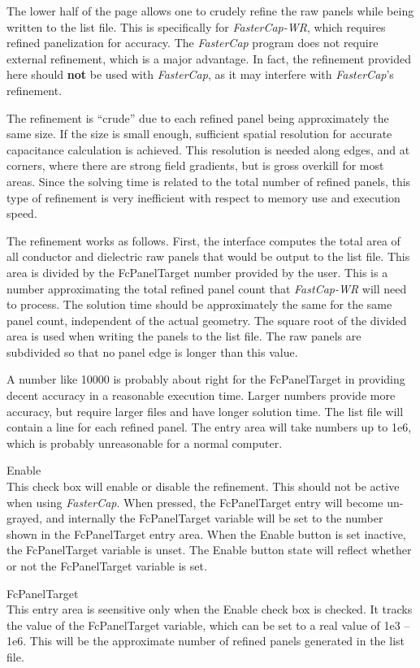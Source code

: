 The lower half of the page allows one to crudely refine the raw panels
while being written to the list file.  This is specifically for {\it
FasterCap-WR}, which requires refined panelization for accuracy.  The
{\it FasterCap} program does not require external refinement, which is
a major advantage.  In fact, the refinement provided here should {\bf
not} be used with {\it FasterCap}, as it may interfere with {\it
FasterCap\/}'s refinement.

The refinement is ``crude'' due to each refined panel being
approximately the same size.  If the size is small enough, sufficient
spatial resolution for accurate capacitance calculation is achieved. 
This resolution is needed along edges, and at corners, where there are
strong field gradients, but is gross overkill for most areas.  Since
the solving time is related to the total number of refined panels,
this type of refinement is very inefficient with respect to memory use
and execution speed.

The refinement works as follows.  First, the interface computes the
total area of all conductor and dielectric raw panels that would be
output to the list file.  This area is divided by the {\cb
FcPanelTarget} number provided by the user.  This is a number
approximating the total refined panel count that {\it FastCap-WR} will
need to process.  The solution time should be approximately the same
for the same panel count, independent of the actual geometry.  The
square root of the divided area is used when writing the panels to the
list file.  The raw panels are subdivided so that no panel edge is
longer than this value.

A number like 10000 is probably about right for the {\cb
FcPanelTarget} in providing decent accuracy in a reasonable execution
time.  Larger numbers provide more accuracy, but require larger files
and have longer solution time.  The list file will contain a line for
each refined panel.  The entry area will take numbers up to 1e6, which
is probably unreasonable for a normal computer.
 
\begin{description}
\item{\cb Enable}\\
This check box will enable or disable the refinement.  This should
not be active when using {\it FasterCap}.  When pressed, the {\cb
FcPanelTarget} entry will become un-grayed, and internally the {\et
FcPanelTarget} variable will be set to the number shown in the
{\cb FcPanelTarget} entry area.  When the {\cb Enable} button is set
inactive, the {\et FcPanelTarget} variable is unset.  The {\cb Enable}
button state will reflect whether or not the {\et FcPanelTarget}
variable is set.

\item{\cb FcPanelTarget}\\
This entry area is seensitive only when the {\cb Enable} check box is
checked.  It tracks the value of the {\et FcPanelTarget} variable,
which can be set to a real value of 1e3 -- 1e6.  This will be the
approximate number of refined panels generated in the list file. 
\end{description}

